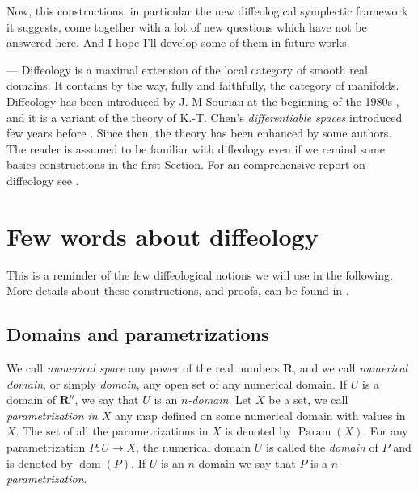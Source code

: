 \documentclass[10pt,reqno,twoside]{amsart}
\newcommand{\RR}{\mathbf{R}}
\DeclareMathOperator{\Param}{Param}
\DeclareMathOperator{\dom}{dom}
\theoremstyle{plain}
\theoremstyle{definition}
\newcommand{\article}[1]{\subsection{#1}}
\begin{document}
  Now,
  this constructions,
  in particular the new diffeological symplectic framework it suggests,
  come together with a lot of new questions which have not be answered here.
  And I hope I'll develop some of them in future works.
  
   --- Diffeology is a maximal extension of the local category of smooth real domains.
  It contains by the way,
  fully and faithfully,
  the category of manifolds.
  Diffeology has been introduced by J.-M Souriau at the beginning of the 1980s \cite{Sou81},
  and it is a variant of the theory of K.-T. Chen's {\em differentiable spaces\/} introduced few years before \cite{Che77}.
  Since then,
  the theory has been enhanced by some authors.
  The reader is assumed to be familiar with diffeology even if we remind some basics constructions in the first Section.
  For an comprehensive report on diffeology see \cite{Piz05}.
  
  \section{Few words about diffeology}
  
  This is a reminder of the few diffeological notions we will use in the following.
  More details about these constructions,
  and proofs,
  can be found in \cite{Piz05}.
  
  \article{Domains and parametrizations}
  \label{Domains-and-parametrizations}
  We call {\em numerical space} any power of the real numbers $\RR$,
  and we call {\em numerical domain},
  or simply {\em domain\/},
  any open set of any numerical domain.
  If $U$ is a domain of $\RR^n$,
  we say that $U$ is an {\em $n$-domain}.
  Let $X$ be a set,
  we call {\em parametrization in $X$} any map defined on some numerical domain with values in $X$.
  The set of all the parametrizations in $X$ is denoted by $\Param(X)$.
  For any parametrization $P : U \to X$,
  the numerical domain $U$ is called the {\em domain} of $P$ and is denoted by $\dom(P)$.
  If $U$ is an $n$-domain we say that $P$ is a {\em $n$-parametrization\/}.
  
\end{document}
